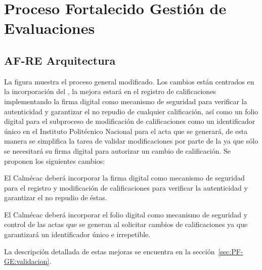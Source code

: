 \chapter{Proceso Fortalecido Gestión de Evaluaciones}
\hypertarget{chapter:AF-GE}{}
\section{AF-RE Arquitectura}


La figura  muestra el proceso general modificado. Los cambios están centrados en la incorporación del , la mejora estará en el registro de calificaciones implementando la firma digital como mecanismo de seguridad para verificar la autenticidad y garantizar el no repudio de cualquier calificación, así como un folio digital para el subproceso de modificación de calificaciones como un identificador único en el Instituto Politécnico Nacional para el acta que se generará, de esta manera se simplifica la tarea de validar modificaciones por parte de la   ya que sólo se necesitará su firma digital para autorizar un cambio de calificación. Se proponen los siguientes cambios:
\begin{Citemize}
    \item El Calmécac deberá incorporar la firma digital como mecanismo de seguridad para el registro y modificación de calificaciones para verificar la autenticidad y garantizar el no repudio de éstas.
    \item El Calmécac deberá incorporar el folio digital como mecanismo de seguridad y control de las actas que se generan al solicitar cambios de calificaciones ya que garantizará un identificador único e irrepetible.
\end{Citemize}

La descripción detallada de estas mejoras se encuentra en la sección~\ref{sec:PF-GE:validacion}.
\pagebreak
{}
\pagebreak
